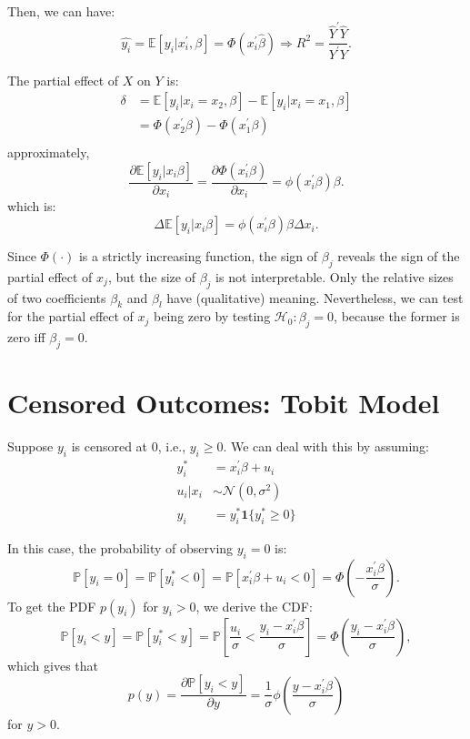 Then, we can have:
\[ 
\hat{y_i} = \mathbb{E}[y_i|x_i^{\prime}, \beta ] = \Phi(x_i^{\prime} \hat{\beta}) \Rightarrow R^2 = \frac{\hat{Y}^{\prime} \hat{Y}}{Y^{\prime} Y}.
\]

The partial effect of $X$ on $Y$ is:
\begin{align*}
    \delta &= \mathbb{E}[y_i|x_i=x_2, \beta] - \mathbb{E}[y_i|x_i=x_1, \beta] \\
    &= \Phi(x_2^{\prime} \beta ) - \Phi(x_1^{\prime} \beta )\\
\end{align*}
approximately,
\[
\frac{\partial \mathbb{E}[y_i|x_i \beta]}{\partial x_i} = \frac{\partial \Phi(x_i^{\prime} \beta)}{\partial x_i} = \phi(x_i^{\prime} \beta) \beta.
\]
which is: 
\[
\Delta \mathbb{E}[y_i|x_i \beta] = \phi(x_i^{\prime} \beta ) \beta \Delta x_i.
\]

Since $\Phi(\cdot)$ is a strictly increasing function, 
the sign of $\beta_j$ reveals the sign of the partial effect of $x_{j}$,
but the size of $\beta_{j}$ is not interpretable. 
Only the relative sizes of two coefficients $\beta_k$ and $\beta_{l}$ 
have (qualitative) meaning. Nevertheless, 
we can test for the partial effect of $x_j$ being zero 
by testing $\mathcal{H}_0:\beta_j=0$, 
because the former is zero iff $\beta_j=0.$

\section{Censored Outcomes: Tobit Model}

Suppose $y_i$ is censored at 0, i.e., $y_i \geq 0$.
We can deal with this by assuming:
\begin{align*}
    y_i^* &= x_i^{\prime} \beta + u_i\\
    u_i|x_i &\sim \mathcal{N}(0, \sigma^2)\\
    y_i &= y_i^* \mathbf{1}\{y_i^* \geq 0\}
\end{align*}

In this case, the probability of observing $y_i=0$ is:
\[
\mathbb{P}[y_i=0] = \mathbb{P}[y_i^* < 0] = \mathbb{P}[x_i^{\prime} \beta + u_i < 0] = \Phi\left(-\frac{x_i^{\prime} \beta}{\sigma}\right).
\]
To get the PDF $p(y_i)$ for $y_{i}>0$, we derive the CDF:
\[ 
\mathbb{P}[y_i < y] = \mathbb{P}[y_i^* < y] = \mathbb{P}\left[\frac{u_i}{\sigma} < \frac{y_{i}-x_i^{\prime} \beta}{\sigma}\right] = \Phi\left(\frac{y_i - x_i^{\prime} \beta}{\sigma}\right),
\]
which gives that
\[
p(y) = \frac{\partial \mathbb{P}[y_i < y]}{\partial y} = \frac{1}{\sigma} \phi\left(\frac{y - x_i^{\prime} \beta}{\sigma}\right)
\]
for $y>0$.

